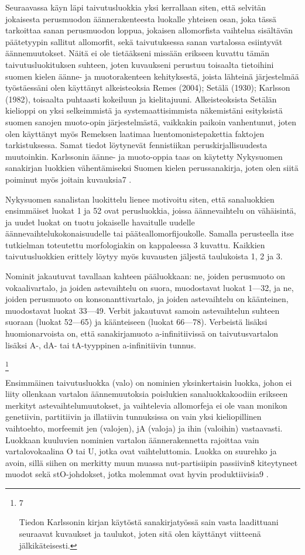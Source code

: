 \documentclass[free]{flammie}
\begin{document}
Seuraavassa käyn läpi taivutusluokkia yksi kerrallaan siten, että selvitän jokaisesta perusmuodon äännerakenteesta luokalle yhteisen osan, joka tässä tarkoittaa sanan perusmuodon loppua, jokaisen allomorfista vaihtelua sisältävän päätetyypin
sallitut allomorfit, sekä taivutuksessa sanan vartalossa esiintyvät äännemuutokset.
Näitä ei ole tietääkseni missään erikseen kuvattu tämän taivutusluokituksen suhteen, joten kuvaukseni perustuu toisaalta tietoihini suomen kielen äänne- ja muotorakenteen kehityksestä, joista lähteinä järjestelmää työstäessäni olen käyttänyt
alkeisteoksia Remes (2004); Setälä (1930); Karlsson (1982), toisaalta puhtaasti
kokeiluun ja kielitajuuni. Alkeisteoksista Setälän kielioppi on yksi selkeimmistä
ja systemaattisimmista näkemistäni esityksistä suomen sanojen muoto-opin järjestelmästä, vaikkakin paikoin vanhentunut, joten olen käyttänyt myös Remeksen
laatimaa luentomonistepakettia faktojen tarkistuksessa. Samat tiedot löytynevät
fennistiikan peruskirjallisuudesta muutoinkin. Karlssonin äänne- ja muoto-oppia
taas on käytetty Nykysuomen sanakirjan luokkien vähentämiseksi Suomen kielen
perussanakirja, joten olen siitä poiminut myös joitain kuvauksia7 .

Nykysuomen sanalistan luokittelu lienee motivoitu siten, että sanaluokkien ensimmäiset luokat 1 ja 52 ovat perusluokkia, joissa äännevaihtelu on vähäisintä, ja
uudet luokat on tuotu jokaiselle havaitulle uudelle äännevaihtelukokonaisuudelle
tai pääteallomorfijoukolle. Samalla perusteella itse tutkielman toteutettu morfologiakin on kappaleessa 3 kuvattu. Kaikkien taivutusluokkien erittely löytyy myös
kuvausten jäljestä taulukoista 1, 2 ja 3.

Nominit jakautuvat tavallaan kahteen pääluokkaan: ne, joiden perusmuoto on vokaalivartalo, ja joiden astevaihtelu on suora, muodostavat luokat 1—32, ja ne, joiden perusmuoto on konsonanttivartalo, ja joiden astevaihtelu on käänteinen, muodostavat luokat 33—49. Verbit jakautuvat samoin astevaihtelun suhteen suoraan
(luokat 52—65) ja käänteiseen (luokat 66—78). Verbeistä lisäksi huomionarvoista on, että sanakirjamuoto a-infinitiivissä on taivutusvartalon lisäksi A-, dA- tai
tA-tyyppinen a-infinitiivin tunnus.

\footnote{
7

Tiedon Karlssonin kirjan käytöstä sanakirjatyössä sain vasta laadittuani seuraavat kuvaukset
ja taulukot, joten sitä olen käyttänyt viitteenä jälkikäteisesti.
}


Ensimmäinen taivutusluokka (valo) on nominien yksinkertaisin luokka, johon
ei liity ollenkaan vartalon äännemuutoksia poislukien sanaluokkakoodiin erikseen
merkityt astevaihtelumuutokset, ja vaihtelevia allomorfeja ei ole vaan monikon
genetiivin, partitiivin ja illatiivin tunnuksissa on vain yksi kieliopillinen vaihtoehto, morfeemit jen (valojen), jA (valoja) ja ihin (valoihin) vastaavasti. Luokkaan
kuuluvien nominien vartalon äännerakennetta rajoittaa vain vartalovokaalina O tai
U, jotka ovat vaihteluttomia. Luokka on suurehko ja avoin, sillä siihen on merkitty muun muassa nut-partisiipin passiivin8 kiteytyneet muodot sekä stO-johdokset,
jotka molemmat ovat hyvin produktiivisia9 .
\end{document}
